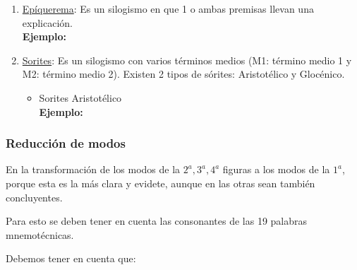 \documentclass{article}
\begin{document}
\begin{enumerate}
    \item \underline{Epíquerema}: Es un silogismo en que 1 o ambas premisas llevan una explicación. \\
    \textbf{Ejemplo:} 
    \item \underline{Sorites}: Es un silogismo con varios términos medios (M1: término medio 1 y M2: término medio 2). Existen 2 tipos de sórites: Aristotélico y Glocénico.
    
    \begin{itemize}
        \item Sorites Aristotélico \\
        \textbf{Ejemplo:}
        \syllog{}{}{}
    \end{itemize}
\end{enumerate}
  
  \subsubsection{Reducción de modos}
  En la transformación  de los modos de la $2^a, 3^a, 4^a$ figuras a los modos de la $1^a$, porque esta es la más clara y evidete, aunque en las otras sean también concluyentes.
  \par Para esto se deben tener en cuenta las consonantes de las 19 palabras mnemotécnicas.
  \par Debemos tener en cuenta que:
  
\end{document}
